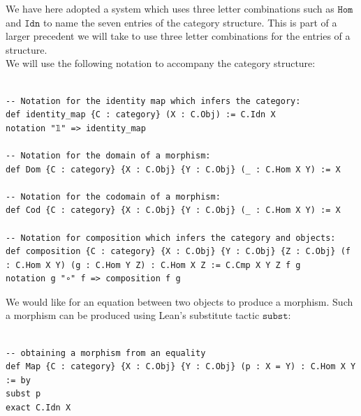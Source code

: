 \documentclass{book}
\newcounter{lcounter}
\begin{document}
We have here adopted a system which uses three letter combinations such as $\texttt{Hom}$ and $\texttt{Idn}$ to name the seven entries of the category structure. This is part of a larger precedent we will take to use three letter combinations for the entries of a structure.\\ 

We will use the following notation to accompany the category structure:

\begin{center}
\begin{tcolorbox}[width=5in,colback={white},title={\begin{center}\texttt{Lean \thelcounter} \addtocounter{lcounter}{1}  \end{center}},colbacktitle=Blue,coltitle=black]
\begin{verbatim}

-- Notation for the identity map which infers the category:
def identity_map {C : category} (X : C.Obj) := C.Idn X
notation "𝟙" => identity_map

-- Notation for the domain of a morphism:
def Dom {C : category} {X : C.Obj} {Y : C.Obj} (_ : C.Hom X Y) := X

-- Notation for the codomain of a morphism:
def Cod {C : category} {X : C.Obj} {Y : C.Obj} (_ : C.Hom X Y) := X

-- Notation for composition which infers the category and objects:
def composition {C : category} {X : C.Obj} {Y : C.Obj} {Z : C.Obj} (f : C.Hom X Y) (g : C.Hom Y Z) : C.Hom X Z := C.Cmp X Y Z f g
notation g "∘" f => composition f g

\end{verbatim}%
\end{tcolorbox}
\end{center}

We would like for an equation between two objects to produce a morphism. Such a morphism can be produced using Lean's substitute tactic $\texttt{subst}$:

\begin{center}
\begin{tcolorbox}[width=5in,colback={white},title={\begin{center}\texttt{Lean \thelcounter} \addtocounter{lcounter}{1}  \end{center}},colbacktitle=Blue,coltitle=black]
\begin{verbatim}

-- obtaining a morphism from an equality
def Map {C : category} {X : C.Obj} {Y : C.Obj} (p : X = Y) : C.Hom X Y := by
subst p
exact C.Idn X

\end{verbatim}%
\end{tcolorbox}
\end{center} 
\end{document}
